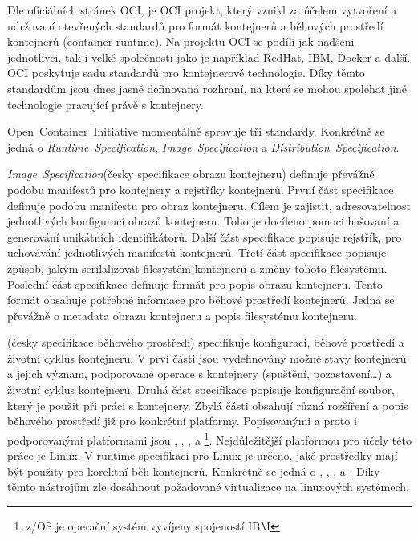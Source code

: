 Dle oficiálních stránek OCI, je OCI projekt, který vznikl za účelem vytvoření a udržovaní otevřených standardů pro formát kontejnerů a běhových prostředí kontejnerů (container runtime). Na projektu OCI se podílí jak nadšeni jednotlivci, tak i velké společnosti jako je například RedHat, IBM, Docker a další. OCI poskytuje sadu standardů pro kontejnerové technologie. Díky těmto standardům jsou dnes jasně definovaná rozhraní, na které se mohou spoléhat jiné technologie pracující právě s kontejnery.\cite{thelinuxfoundation_about}

Open~Container~Initiative momentálně spravuje tři standardy. Konkrétně se jedná o \textit{Runtime~Specification}, \textit{Image~Specification} a \textit{Distribution~Specification}.\cite{thelinuxfoundation_about}

\textit{Image~Specification}(česky specifikace obrazu kontejneru) definuje převážně podobu manifestů pro kontejnery a rejstříky kontejnerů.
První část specifikace definuje podobu manifestu pro obraz kontejneru. Cílem je zajistit, adresovatelnost jednotlivých konfigurací obrazů kontejneru. Toho je docíleno pomocí hašovaní a generování unikátních identifikátorů. Další část specifikace popisuje rejstřík, pro uchovávání jednotlivých manifestů kontejnerů. Třetí část specifikace popisuje způsob, jakým serilalizovat filesystém kontejneru a změny tohoto filesystému. Poslední část specifikace definuje formát pro popis obrazu kontejneru. Tento formát obsahuje potřebné informace pro běhové prostředí kontejnerů. Jedná se převážně o metadata obrazu kontejneru a popis filesystému kontejneru.\cite{opencontainerinitiative_2022_image}

(česky specifikace běhového prostředí) specifikuje konfiguraci, běhové prostředí a životní cyklus kontejneru. V prví části jsou vydefinovány možné stavy kontejnerů a jejich význam, podporované operace s kontejnery (spuštění, pozastavení\ldots) a životní cyklus kontejneru. Druhá část specifikace popisuje konfigurační soubor, který je použit při práci s kontejnery. Zbylá části obsahují různá rozšíření a popis běhového prostředí již pro konkrétní platformy. Popisovanými a proto i podporovanými platformami jsou , , ,  a \footnote{z/OS je operační systém vyvíjeny spojeností IBM}. Nejdůležitější platformou pro účely této práce je Linux. V runtime specifikaci pro Linux je určeno, jaké prostředky mají být použity pro korektní běh kontejnerů. Konkrétně se jedná o , , ,  a . Díky těmto nástrojům zle dosáhnout požadované virtualizace na linuxových systémech.\cite{opencontainerinitiative_2022_open}


